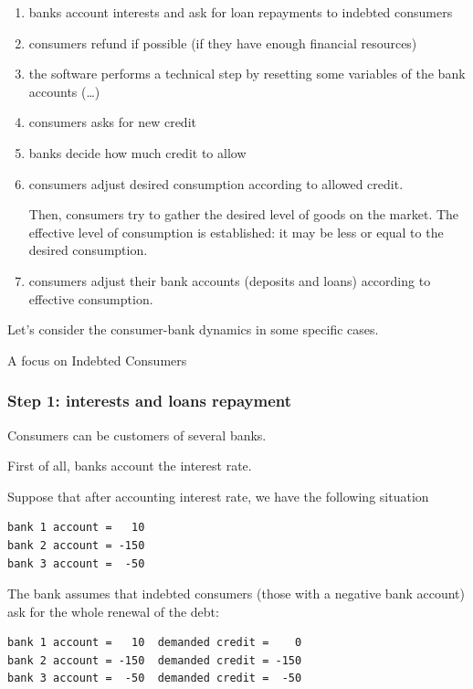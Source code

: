 \documentclass{article}
\begin{document}
\begin{enumerate}
	\item banks account interests and ask for loan repayments to indebted consumers
	\item consumers refund if possible (if they have enough financial resources)
	\item the software performs a technical step by resetting some variables of the bank accounts (\dots)
	\item consumers asks for new credit
	\item banks decide how much credit to allow
	\item consumers adjust desired consumption according to allowed credit. 
		
		Then, consumers try to gather the desired level of goods on the market. The effective level of consumption is established: it may be less or equal to the desired consumption.
	\item consumers adjust their bank accounts (deposits and loans) according to effective consumption.
\end{enumerate}

Let's consider the consumer-bank dynamics in some specific cases.
\fi

A focus on Indebted Consumers
\subsubsection*{Step 1: interests and loans repayment}

Consumers can be customers of several banks.

First of all, banks account the interest rate.

Suppose that after accounting interest rate, we have the following situation
\begin{verbatim}
bank 1 account =   10
bank 2 account = -150
bank 3 account =  -50
\end{verbatim}

The bank assumes that indebted consumers (those with a negative bank account) ask for the whole renewal of the debt:

\begin{verbatim}
bank 1 account =   10  demanded credit =    0
bank 2 account = -150  demanded credit = -150
bank 3 account =  -50  demanded credit =  -50
\end{verbatim}
\end{document}
